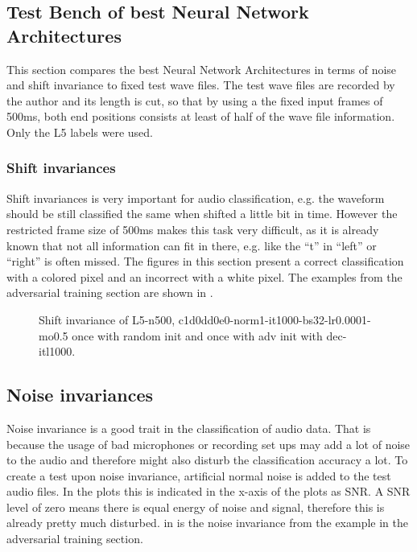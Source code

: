 \subsection{Test Bench of best Neural Network Architectures}
This section compares the best Neural Network Architectures in terms of noise and shift invariance to fixed test wave files.
The test wave files are recorded by the author and its length is cut, so that by using a the fixed input frames of 500ms, both end positions consists at least of half of the wave file information.
Only the L5 labels were used.

\subsubsection{Shift invariances}
Shift invariances is very important for audio classification, e.g. the waveform should be still classified the same when shifted a little bit in time.
However the restricted frame size of 500ms makes this task very difficult, as it is already known that not all information can fit in there, e.g. like the \enquote{t} in \enquote{left} or \enquote{right} is often missed.
The figures in this section present a correct classification with a colored pixel and an incorrect with a white pixel.
The examples from the adversarial training section are shown in .
\begin{figure}[!ht]
  \centering
  \caption{Shift invariance of L5-n500, c1d0dd0e0-norm1-it1000-bs32-lr0.0001-mo0.5 once with random init and once with adv init with dec-itl1000.}
  \label{fig:ml_test_bench_shift_fc3}
\end{figure}
\FloatBarrier
\noindent


\subsection{Noise invariances}
Noise invariance is a good trait in the classification of audio data.
That is because the usage of bad microphones or recording set ups may add a lot of noise to the audio and therefore might also disturb the classification accuracy a lot.
To create a test upon noise invariance, artificial normal noise is added to the test audio files.
In the plots this is indicated in the x-axis of the plots as SNR. 
A SNR level of zero means there is equal energy of noise and signal, therefore this is already pretty much disturbed.
in  is the noise invariance from the example in the adversarial training section.

